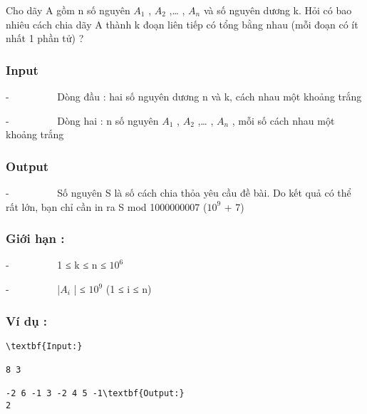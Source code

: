 



   Cho dãy A gồm n số nguyên $A_{1}$   , $A_{2}$   ,… , $A_{n}$   và số nguyên dương k. Hỏi có bao nhiêu cách chia dãy A thành k đoạn liên tiếp có tổng bằng nhau (mỗi đoạn có ít nhất 1 phần tử) ?  

\subsubsection{   Input  }

   -          Dòng đầu : hai số nguyên dương n và k, cách nhau một khoảng trắng  

   -          Dòng hai : n số nguyên $A_{1}$   , $A_{2}$   ,… , $A_{n}$   , mỗi số cách nhau một khoảng trắng  

\subsubsection{   Output  }

   -          Số nguyên S là số cách chia thỏa yêu cầu đề bài. Do kết quả có thể rất lớn, bạn chỉ cần in ra S mod 1000000007 ($10^{9}$   + 7)  

\subsubsection{   Giới hạn :  }

   -          1 ≤ k ≤ n ≤ $10^{6}$

   -          |$A_{i}$   | ≤ $10^{9}$   (1 ≤ i ≤ n)  

\subsubsection{   Ví dụ :  }
\begin{verbatim}
\textbf{Input:}

8 3

-2 6 -1 3 -2 4 5 -1\textbf{Output:}
2\end{verbatim}
